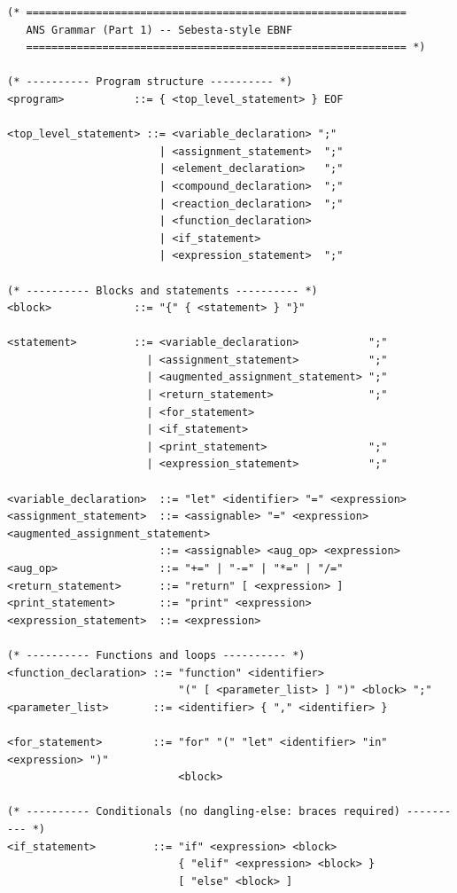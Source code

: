 \documentclass[11pt,a4paper]{article}
\begin{document}
\begin{lstlisting}[style=ebnf]
(* ============================================================
   ANS Grammar (Part 1) -- Sebesta-style EBNF
   ============================================================ *)

(* ---------- Program structure ---------- *)
<program>           ::= { <top_level_statement> } EOF

<top_level_statement> ::= <variable_declaration> ";"
                        | <assignment_statement>  ";"
                        | <element_declaration>   ";"
                        | <compound_declaration>  ";"
                        | <reaction_declaration>  ";"
                        | <function_declaration>
                        | <if_statement>
                        | <expression_statement>  ";"

(* ---------- Blocks and statements ---------- *)
<block>             ::= "{" { <statement> } "}"

<statement>         ::= <variable_declaration>           ";"
                      | <assignment_statement>           ";"
                      | <augmented_assignment_statement> ";"
                      | <return_statement>               ";"
                      | <for_statement>
                      | <if_statement>
                      | <print_statement>                ";"
                      | <expression_statement>           ";"

<variable_declaration>  ::= "let" <identifier> "=" <expression>
<assignment_statement>  ::= <assignable> "=" <expression>
<augmented_assignment_statement>
                        ::= <assignable> <aug_op> <expression>
<aug_op>                ::= "+=" | "-=" | "*=" | "/="
<return_statement>      ::= "return" [ <expression> ]
<print_statement>       ::= "print" <expression>
<expression_statement>  ::= <expression>

(* ---------- Functions and loops ---------- *)
<function_declaration> ::= "function" <identifier>
                           "(" [ <parameter_list> ] ")" <block> ";"
<parameter_list>       ::= <identifier> { "," <identifier> }

<for_statement>        ::= "for" "(" "let" <identifier> "in" <expression> ")"
                           <block>

(* ---------- Conditionals (no dangling-else: braces required) ---------- *)
<if_statement>         ::= "if" <expression> <block>
                           { "elif" <expression> <block> }
                           [ "else" <block> ]


\end{lstlisting}
\end{document}
